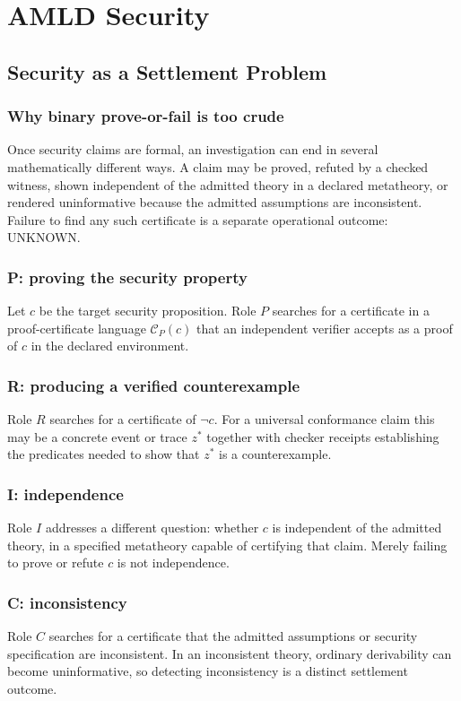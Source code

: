 \documentclass[11pt,oneside]{book}
\theoremstyle{definition}
\theoremstyle{remark}
\begin{document}
\part{AMLD Security}

\chapter{Security as a Settlement Problem}
\label{ch:settlement}
\section{Why binary prove-or-fail is too crude}
Once security claims are formal, an investigation can end in several mathematically different ways. A claim may be proved, refuted by a checked witness, shown independent of the admitted theory in a declared metatheory, or rendered uninformative because the admitted assumptions are inconsistent. Failure to find any such certificate is a separate operational outcome: UNKNOWN.

\section{P: proving the security property}
Let $c$ be the target security proposition. Role $P$ searches for a certificate in a proof-certificate language $\mathcal C_P(c)$ that an independent verifier accepts as a proof of $c$ in the declared environment.

\section{R: producing a verified counterexample}
Role $R$ searches for a certificate of $\neg c$. For a universal conformance claim this may be a concrete event or trace $z^*$ together with checker receipts establishing the predicates needed to show that $z^*$ is a counterexample.

\section{I: independence}
Role $I$ addresses a different question: whether $c$ is independent of the admitted theory, in a specified metatheory capable of certifying that claim. Merely failing to prove or refute $c$ is not independence.

\section{C: inconsistency}
Role $C$ searches for a certificate that the admitted assumptions or security specification are inconsistent. In an inconsistent theory, ordinary derivability can become uninformative, so detecting inconsistency is a distinct settlement outcome.
\end{document}
